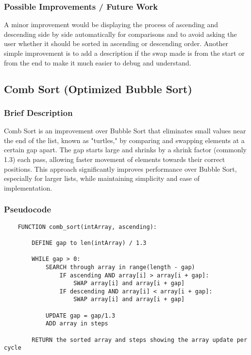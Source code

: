 \documentclass{article}
\begin{document}
\subsubsection*{Possible Improvements / Future Work}
A minor improvement would be displaying the process of ascending and descending side by side automatically for comparisons and to avoid asking the user whether it should be sorted in ascending or descending order. Another simple improvement is to add a description if the swap made is from the start or from the end to make it much easier to debug and understand.


\subsection{Comb Sort (Optimized Bubble Sort)}
\subsubsection*{Brief Description}
Comb Sort is an improvement over Bubble Sort that eliminates small values near the end of the list, known as "turtles," by comparing and swapping elements at a certain gap apart. The gap starts large and shrinks by a shrink factor (commonly 1.3) each pass, allowing faster movement of elements towards their correct positions. This approach significantly improves performance over Bubble Sort, especially for larger lists, while maintaining simplicity and ease of implementation.
\subsubsection*{Pseudocode}
\begin{lstlisting}
    FUNCTION comb_sort(intArray, ascending):
    
        DEFINE gap to len(intArray) / 1.3

        WHILE gap > 0:
            SEARCH through array in range(length - gap)
                IF ascending AND array[i] > array[i + gap]:
                    SWAP array[i] and array[i + gap] 
                IF descending AND array[i] < array[i + gap]:
                    SWAP array[i] and array[i + gap]
            
            UPDATE gap = gap/1.3
            ADD array in steps

        RETURN the sorted array and steps showing the array update per cycle
\end{lstlisting}
\end{document}
